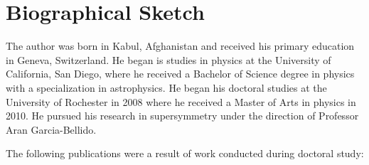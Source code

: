\section*{Biographical Sketch}

The author was born in Kabul, Afghanistan and received his primary 
education in Geneva, Switzerland. He began is studies in physics at 
the University of California, San Diego, where he received a Bachelor 
of Science degree in physics with a specialization in astrophysics.   
He began his doctoral studies at the University of Rochester 
in 2008 where he received a Master of Arts in physics in 2010. 
He pursued his research in supersymmetry under the direction 
of Professor Aran Garcia-Bellido.

The following publications were a result of work conducted during doctoral study:
\begingroup
\renewcommand\refname{}%

\endgroup
